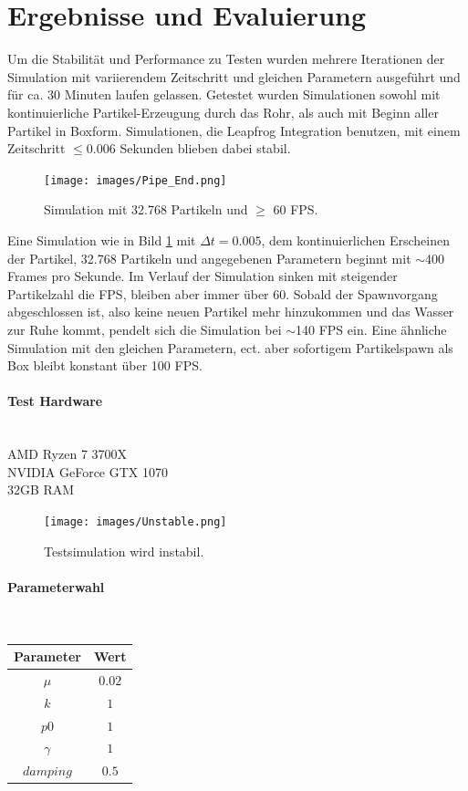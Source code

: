 \documentclass[a4paper]{paper}
\begin{document}
\section{Ergebnisse und Evaluierung}


Um die Stabilität und Performance zu Testen wurden mehrere Iterationen der Simulation mit variierendem Zeitschritt und gleichen Parametern ausgeführt und für ca. 30 Minuten laufen gelassen. Getestet wurden Simulationen sowohl mit kontinuierliche Partikel-Erzeugung durch das Rohr, als auch mit Beginn aller Partikel in Boxform. Simulationen, die Leapfrog Integration benutzen, mit einem Zeitschritt $\leq 0.006$ Sekunden blieben dabei stabil.

\begin{figure}[t]
	\centering
	\texttt{[image: images/Pipe\_End.png]}
	\caption{Simulation mit 32.768 Partikeln und $\geq$ 60 FPS.}
	\label{fig:final_simulation}
\end{figure}

 Eine  Simulation wie in Bild \ref{fig:final_simulation} mit $\Delta t = 0.005$, dem kontinuierlichen Erscheinen der Partikel, 32.768 Partikeln und angegebenen Parametern beginnt mit $\sim$400 Frames pro Sekunde. Im Verlauf der Simulation sinken mit steigender Partikelzahl die FPS, bleiben aber immer über 60. Sobald der Spawnvorgang abgeschlossen ist, also keine neuen Partikel mehr hinzukommen und das Wasser zur Ruhe kommt, pendelt sich die Simulation bei $\sim$140 FPS ein.
 Eine ähnliche Simulation mit den gleichen Parametern, ect. aber sofortigem Partikelspawn als Box bleibt konstant über 100 FPS.


\paragraph{Test Hardware}\mbox{}\\
AMD Ryzen 7 3700X \\
NVIDIA GeForce GTX 1070\\
32GB RAM\\


\begin{figure}[t]
	\centering
	\texttt{[image: images/Unstable.png]}
	\caption{Testsimulation wird instabil.}
	\label{fig:unstable}
\end{figure}


\paragraph{Parameterwahl}\mbox{}\\
\begin{center}
	\begin{tabular}{ c|c }
	\hline
	Parameter & Wert \\
	
	\hline
 	$\mu$ & $0.02$\\
	$k$ & $1$\\
	$p0$ & $1$\\
	$\gamma$ & $1$\\
$damping$& $0.5$\\
\hline
	\end{tabular}
\end{center}
\end{document}
